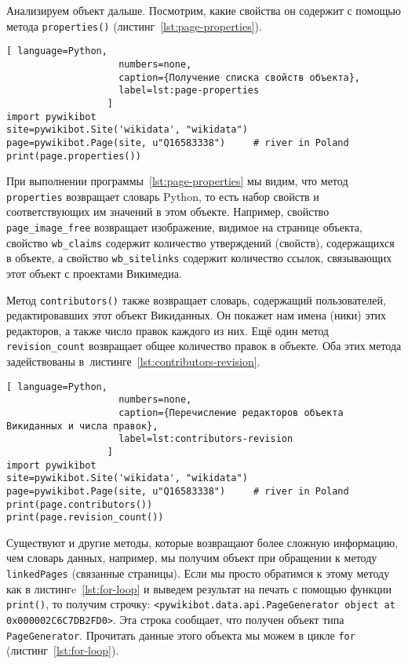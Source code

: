 Анализируем объект дальше. Посмотрим, какие свойства он содержит 
с помощью метода \lstinline|properties()| (листинг~\ref{lst:page-properties}).

\begin{lstlisting}[ language=Python,
                    numbers=none,
                    caption={Получение списка свойств объекта},
                    label=lst:page-properties
                  ]
import pywikibot
site=pywikibot.Site('wikidata', "wikidata")
page=pywikibot.Page(site, u"Q16583338")     # river in Poland
print(page.properties())
\end{lstlisting}

При выполнении программы~\ref{lst:page-properties} мы видим, что метод \lstinline|properties| 
возвращает словарь Python, то есть набор свойств и соответствующих им значений в этом объекте. 
Например, свойство \lstinline|page_image_free| возвращает изображение, видимое на странице объекта, 
свойство \lstinline|wb_claims| содержит количество утверждений (свойств), содержащихся в объекте, 
а свойство \lstinline|wb_sitelinks| содержит количество ссылок, связывающих этот объект с проектами Викимедиа.

Метод \lstinline|contributors()| также возвращает словарь, содержащий пользователей, 
редактировавших этот объект Викиданных. 
Он покажет нам имена (ники) этих редакторов, 
а также число правок каждого из них. 
Ещё один метод \lstinline|revision_count| возвращает общее количество правок в объекте. Оба этих метода задействованы в~листинге~\ref{lst:contributors-revision}.

\begin{lstlisting}[ language=Python,
                    numbers=none,
                    caption={Перечисление редакторов объекта Викиданных и числа правок},
                    label=lst:contributors-revision
                  ]
import pywikibot
site=pywikibot.Site('wikidata', "wikidata")
page=pywikibot.Page(site, u"Q16583338")     # river in Poland
print(page.contributors())
print(page.revision_count())
\end{lstlisting}

Существуют и другие методы, которые возвращают более сложную информацию, 
чем словарь данных, например, мы получим объект при обращении 
к методу \lstinline|linkedPages| (связанные страницы). Если мы просто обратимся к этому методу как в листингe~\ref{lst:for-loop} и выведем результат на печать с помощью функции \lstinline|print()|, то получим строчку: 
\lstinline|<pywikibot.data.api.PageGenerator object at 0x000002C6C7DB2FD0>|. 
Эта строка сообщает, что получен объект типа \lstinline|PageGenerator|. 
Прочитать данные этого объекта мы можем в цикле \lstinline|for| (листинг~\ref{lst:for-loop}).

